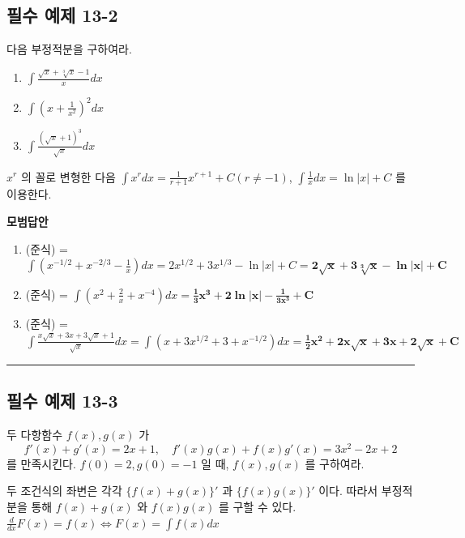 \documentclass[a4paper,11pt]{article}
\begin{document}
\subsection*{필수 예제 13-2}
다음 부정적분을 구하여라.
\begin{enumerate}[label=(\arabic*)]
    \item $\displaystyle \int \frac{\sqrt{x}+\sqrt[3]{x}-1}{x}dx$
    \item $\displaystyle \int \left( x + \frac{1}{x^2} \right)^2 dx$
    \item $\displaystyle \int \frac{(\sqrt{x}+1)^3}{\sqrt{x}}dx$
\end{enumerate}

\begin{studybox}
$x^r$ 의 꼴로 변형한 다음 $\displaystyle \int x^r dx = \frac{1}{r+1}x^{r+1}+C (r \ne -1)$, $\displaystyle \int \frac{1}{x}dx = \ln|x|+C$ 를 이용한다.
\end{studybox}

\textbf{모범답안}
\begin{enumerate}[label=(\arabic*)]
    \item (준식) = $\displaystyle \int (x^{-1/2} + x^{-2/3} - \frac{1}{x})dx = 2x^{1/2} + 3x^{1/3} - \ln|x| + C = \mathbf{2\sqrt{x} + 3\sqrt[3]{x} - \ln|x| + C}$
    \item (준식) = $\displaystyle \int (x^2 + \frac{2}{x} + x^{-4})dx = \mathbf{\frac{1}{3}x^3 + 2\ln|x| - \frac{1}{3x^3} + C}$
    \item (준식) = $\displaystyle \int \frac{x\sqrt{x}+3x+3\sqrt{x}+1}{\sqrt{x}}dx = \int (x+3x^{1/2}+3+x^{-1/2})dx = \mathbf{\frac{1}{2}x^2+2x\sqrt{x}+3x+2\sqrt{x}+C}$
\end{enumerate}

\vspace{0.5cm}
\hrule
\vspace{0.5cm}

\subsection*{필수 예제 13-3}
두 다항함수 $f(x), g(x)$ 가
\[ f'(x)+g'(x)=2x+1, \quad f'(x)g(x)+f(x)g'(x)=3x^{2}-2x+2 \]
를 만족시킨다. $f(0)=2, g(0)=-1$ 일 때, $f(x), g(x)$ 를 구하여라.

\begin{studybox}
두 조건식의 좌변은 각각 $\{f(x)+g(x)\}'$ 과 $\{f(x)g(x)\}'$ 이다. 따라서 부정적분을 통해 $f(x)+g(x)$ 와 $f(x)g(x)$ 를 구할 수 있다.\\
$\displaystyle \frac{d}{dx}F(x)=f(x) \iff F(x)=\int f(x)dx$
\end{studybox}
\end{document}
